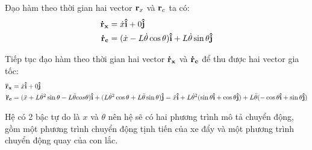 \documentclass[12pt,a4paper]{article}
\begin{document}
Đạo hàm theo thời gian hai vector $\vb r_x$ và $\vb r_c$ ta có:
\begin{equation}
    \begin{aligned}
    \vb{\dot r_x}  &= \dot x \vb{\hat i} + 0\vb{\hat j}\\
    \vb{\dot r_c}  &= (\dot x - L\dot\theta \cos\theta)\vb{\hat i} +L\dot\theta\sin\theta \vb{\hat j}
\end{aligned}
\end{equation}

Tiếp tục đạo hàm theo thời gian hai vector $\vb {\dot r_x}$ và $\vb {\dot r_c}$ để thu được hai vector gia tốc:
{\small
\begin{equation}
    \begin{aligned}
    \vb{\ddot r_x}  & = \ddot x \vb{\hat i} + 0\vb{\hat j}\\
    \vb{\ddot r_c}  & = (\ddot x + L\dot\theta^2 \sin\theta - L\ddot \theta cos\theta)\vb{\hat i} +(L\dot\theta^2\cos\theta + L \ddot\theta \sin\theta)\vb{\hat j} = \ddot x\vb{\hat i} + L \dot\theta^2 (\sin\theta \vb{\hat i}+\cos\theta \vb{\hat j}) + L\ddot\theta (-\cos \theta\vb{\hat i} +\sin\theta\vb{\hat j}) \label{eqn:r}
\end{aligned}
\end{equation}}

Hệ có 2 bậc tự do là $x$ và $\theta$ nên hệ sẽ có hai phương trình mô tả chuyển động, gồm một phương trình chuyển động tịnh tiến của xe đẩy và một phương trình chuyển động quay của con lắc.
\end{document}
